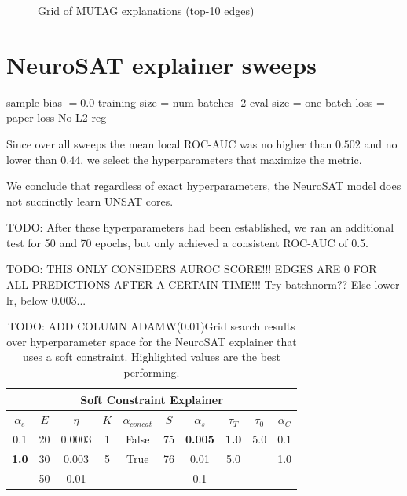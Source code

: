 \begin{figure}[htbp]
    \centering
    \caption{Grid of MUTAG explanations (top-10 edges)}
    \label{fig:grid-MUTAG-explanations}
\end{figure}

\clearpage
\section{NeuroSAT explainer sweeps}

sample bias $=0.0$
training size = num batches -2
eval size = one batch
loss = paper loss
No L2 reg

Since over all sweeps the mean local ROC-AUC was no higher than $0.502$ and no lower than $0.44$, we select the hyperparameters that maximize the metric.

We conclude that regardless of exact hyperparameters, the NeuroSAT model does not succinctly learn UNSAT cores.


TODO: After these hyperparameters had been established, we ran an additional test for 50 and 70 epochs, but only achieved a consistent ROC-AUC of 0.5.


TODO: THIS ONLY CONSIDERS AUROC SCORE!!! EDGES ARE 0 FOR ALL PREDICTIONS AFTER A CERTAIN TIME!!! Try batchnorm?? Else lower lr, below 0.003...


\begin{table}[h]
  \centering
  \scriptsize
  \begin{tabular}{|c|c|c|c|c|c|c|c|c|c|}
  \hline
  \multicolumn{10}{|c|}{\textbf{Soft Constraint Explainer}} \\ \hline
  $\alpha_e$ & $E$ & $\eta$ & $K$ & $\alpha_{concat}$ & $S$ & $\alpha_s$ & $\tau_T$ & $\tau_0$ & $\alpha_{C}$\\ \hline
  0.1 & 20 & 0.0003 & 1 & False & 75 & \textbf{0.005} & \textbf{1.0} & 5.0 & 0.1\\ 
  \textbf{1.0} & 30 & 0.003 & 5 & True & 76 & 0.01 & 5.0 &  & 1.0\\ 
   & 50 & 0.01 &  &  &  & 0.1 &  &  & \\ \hline
  \end{tabular}
  \caption[NeuroSAT soft constraint Sweep]{TODO: ADD COLUMN ADAMW(0.01)Grid search results over hyperparameter space for the NeuroSAT explainer that uses a soft constraint. Highlighted values are the best performing.}
\end{table}


